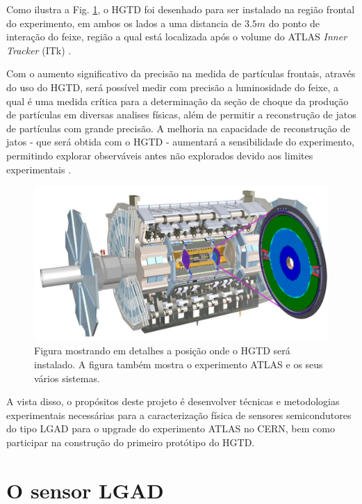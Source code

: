 Como ilustra a Fig. \ref{hgtd}, o HGTD foi desenhado para ser instalado na região frontal do experimento, em ambos os lados a uma distancia de $3.5m$ do ponto de interação do feixe, região a qual está localizada após o volume do ATLAS {\it Inner Tracker} (ITk) \cite{tdr}.

\thispagestyle{plain}
Com o aumento significativo da precisão na medida de partículas frontais, através do uso do HGTD, será possível medir com precisão a luminosidade do feixe, a qual é uma medida crítica para a determinação da seção de choque da produção de partículas em diversas analises físicas, além de  permitir a reconstrução de jatos de partículas com grande precisão. A melhoria na capacidade de reconstrução de jatos - que será obtida com o HGTD - aumentará a sensibilidade do experimento, permitindo explorar observáveis antes não explorados devido aos limites experimentais \cite{tdr}.

\thispagestyle{plain}
\begin{figure} 
    \centering
    \includegraphics[width=15.0cm]{assets/ATLAS_HGTD.png}
    \caption{ Figura mostrando em detalhes a posição onde o HGTD será instalado. A figura também mostra o experimento ATLAS e os seus vários sistemas.}
    \label{hgtd}
\end{figure}

A vista disso, o propósitos deste projeto é desenvolver técnicas e metodologias experimentais necessárias para a caracterização física de sensores semicondutores do tipo LGAD para o upgrade do experimento ATLAS no CERN, bem como participar na construção do primeiro protótipo do HGTD.

\section{O sensor LGAD}

